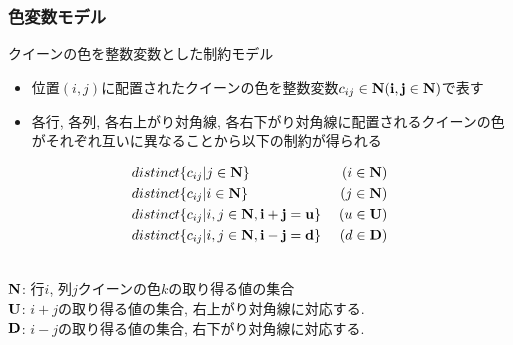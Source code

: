 \documentclass [dvipdfmx,11pt]{beamer}
\begin{document}
\begin{frame}
    \frametitle{色変数モデル}
    {\small
        \alert{クイーンの色}を整数変数とした制約モデル\\
        \setlength{\abovedisplayskip}{1pt} %
        \setlength{\belowdisplayskip}{1pt} %
        \begin{block}{}
            \begin{itemize}
                \item 位置$(i, j)$に配置されたクイーンの色を整数変数$c_{ij} \in \bf N (i, j \in \bf N)$で表す
                \item \alert{各行}, \alert{各列}, \alert{各右上がり対角線}, \alert{各右下がり対角線}に配置されるクイーンの色がそれぞれ互いに異なることから以下の制約が得られる
            \end{itemize}
            \vspace{-0.5\baselineskip}           %
            \begin{eqnarray*}
& distinct\{c_{ij} | j \in \bf N\} \; & (i \in \bf N)\\
& distinct\{c_{ij} | i \in \bf N\} \; & (j \in \bf N)\\
& distinct\{c_{ij} | i, j \in \bf N,  i+j=u\} \; & (u \in \bf U)\\
& distinct\{c_{ij} | i, j \in \bf N,  i-j=d\} \; & (d \in \bf D)
            \end{eqnarray*}
        \end{block}
    }
    \\
    {\footnotesize
        $\bf N$: 行$i$, 列$j$クイーンの色$k$の取り得る値の集合\\
        $\bf U$: $i+j$の取り得る値の集合, 右上がり対角線に対応する.\\
        $\bf D$: $i-j$の取り得る値の集合, 右下がり対角線に対応する.\\
    }
\end{frame}
\end{document}
